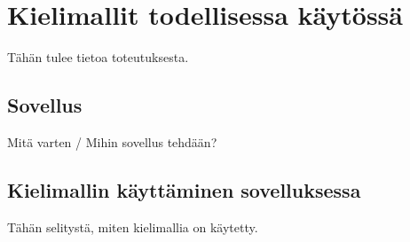 \chapter{Kielimallit todellisessa käytössä}%
\label{ch:toteutus}

Tähän tulee tietoa toteutuksesta.

\section{Sovellus}

Mitä varten / Mihin sovellus tehdään?

\section{Kielimallin käyttäminen sovelluksessa}

Tähän selitystä, miten kielimallia on käytetty.

